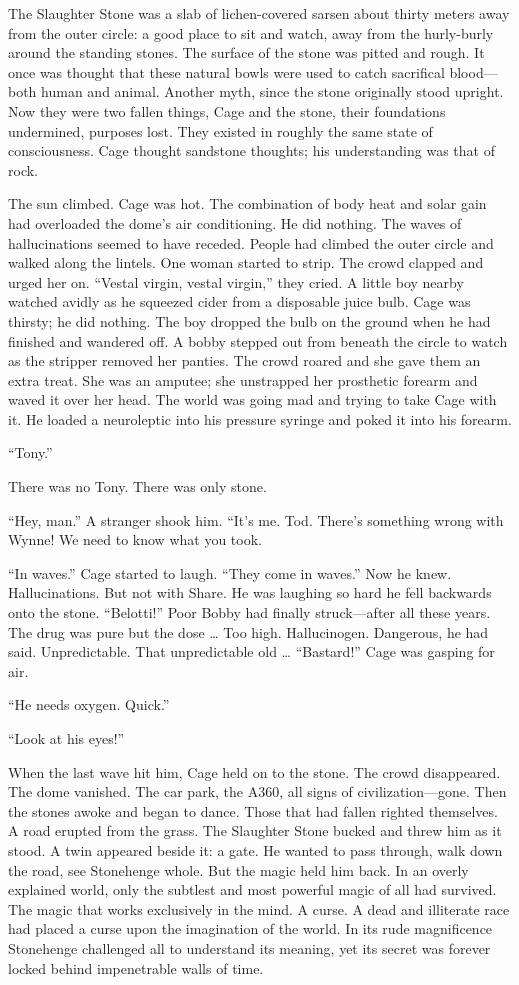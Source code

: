 The Slaughter Stone was a slab of lichen-covered sarsen about thirty meters away from the outer circle: a good place to sit and watch, away from the hurly-burly around the standing stones. The surface of the stone was pitted and rough. It once was thought that these natural bowls were used to catch sacrifical blood---both human and animal. Another myth, since the stone originally stood upright. Now they were two fallen things, Cage and the stone, their foundations undermined, purposes lost. They existed in roughly the same state of consciousness. Cage thought sandstone thoughts; his understanding was that of rock.

The sun climbed. Cage was hot. The combination of body heat and solar gain had overloaded the dome's air conditioning. He did nothing. The waves of hallucinations seemed to have receded. People had climbed the outer circle and walked along the lintels. One woman started to strip. The crowd clapped and urged her on. ``Vestal virgin, vestal virgin,'' they cried. A little boy nearby watched avidly as he squeezed cider from a disposable juice bulb. Cage was thirsty; he did nothing. The boy dropped the bulb on the ground when he had finished and wandered off. A bobby stepped out from beneath the circle to watch as the stripper removed her panties. The crowd roared and she gave them an extra treat. She was an amputee; she unstrapped her prosthetic forearm and waved it over her head. The world was going mad and trying to take Cage with it. He loaded a neuroleptic into his pressure syringe and poked it into his forearm.

``Tony.''

There was no Tony. There was only stone.

``Hey, man.'' A stranger shook him. ``It's me. Tod. There's something wrong with Wynne! We need to know what you took.

``In waves.'' Cage started to laugh. ``They come in waves.'' Now he knew. Hallucinations. But not with Share. He was laughing so hard he fell backwards onto the stone. ``Belotti!'' Poor Bobby had finally struck---after all these years. The drug was pure but the dose … Too high. Hallucinogen. Dangerous, he had said. Unpredictable. That unpredictable old … ``Bastard!'' Cage was gasping for air.

``He needs oxygen. Quick.''

``Look at his eyes!''

When the last wave hit him, Cage held on to the stone. The crowd disappeared. The dome vanished. The car park, the A360, all signs of civilization---gone. Then the stones awoke and began to dance. Those that had fallen righted themselves. A road erupted from the grass. The Slaughter Stone bucked and threw him as it stood. A twin appeared beside it: a gate. He wanted to pass through, walk down the road, see Stonehenge whole. But the magic held him back. In an overly explained world, only the subtlest and most powerful magic of all had survived. The magic that works exclusively in the mind. A curse. A dead and illiterate race had placed a curse upon the imagination of the world. In its rude magnificence Stonehenge challenged all to understand its meaning, yet its secret was forever locked behind impenetrable walls of time.


